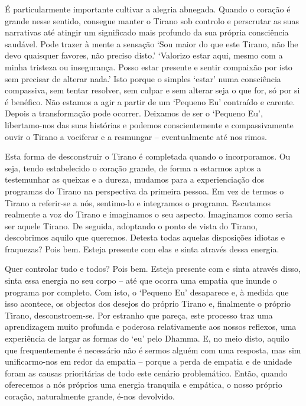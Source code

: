 É particularmente importante cultivar a alegria abnegada. Quando o coração é
grande nesse sentido, consegue manter o Tirano sob controlo e perscrutar as suas
narrativas até atingir um significado mais profundo da sua própria consciência
saudável. Pode trazer à mente a sensação `Sou maior do que este Tirano, não lhe
devo quaisquer favores, não preciso disto.' `Valorizo estar aqui, mesmo com a
minha tristeza ou insegurança. Posso estar presente e sentir compaixão por isto
sem precisar de alterar nada.' Isto porque o simples `estar' numa consciência
compassiva, sem tentar resolver, sem culpar e sem alterar seja o que for, só por
si é benéfico. Não estamos a agir a partir de um `Pequeno Eu' contraído e
carente. Depois a transformação pode ocorrer. Deixamos de ser o `Pequeno Eu',
libertamo-nos das suas histórias e podemos conscientemente e compassivamente
ouvir o Tirano a vociferar e a resmungar -- eventualmente até nos rimos.

Esta forma de desconstruir o Tirano é completada quando o incorporamos. Ou seja,
tendo estabelecido o coração grande, de forma a estarmos aptos a testemunhar as
queixas e a dureza, mudamos para a experienciação dos programas do Tirano na
perspectiva da primeira pessoa. Em vez de termos o Tirano a referir-se a nós,
sentimo-lo e integramos o programa. Escutamos realmente a voz do Tirano e
imaginamos o seu aspecto. Imaginamos como seria ser aquele Tirano. De seguida,
adoptando o ponto de vista do Tirano, descobrimos aquilo que queremos. Detesta
todas aquelas disposições idiotas e fraquezas? Pois bem. Esteja presente com
elas e sinta através dessa energia.

Quer controlar tudo e todos? Pois bem. Esteja presente com e sinta através
disso, sinta essa energia no seu corpo -- até que ocorra uma empatia que inunde
o programa por completo. Com isto, o `Pequeno Eu' desaparece e, à medida que
isso acontece, os objectos dos desejos do próprio Tirano e, finalmente o próprio
Tirano, desconstroem-se. Por estranho que pareça, este processo traz uma
aprendizagem muito profunda e poderosa relativamente aos nossos reflexos, uma
experiência de largar as formas do `eu' pelo Dhamma. E, no meio disto, aquilo
que frequentemente é necessário não é sermos alguém com uma resposta, mas sim
unificarmo-nos em redor da empatia -- porque a perda de empatia e de unidade
foram as causas prioritárias de todo este cenário problemático. Então, quando
oferecemos a nós próprios uma energia tranquila e empática, o nosso próprio
coração, naturalmente grande, é-nos devolvido.


